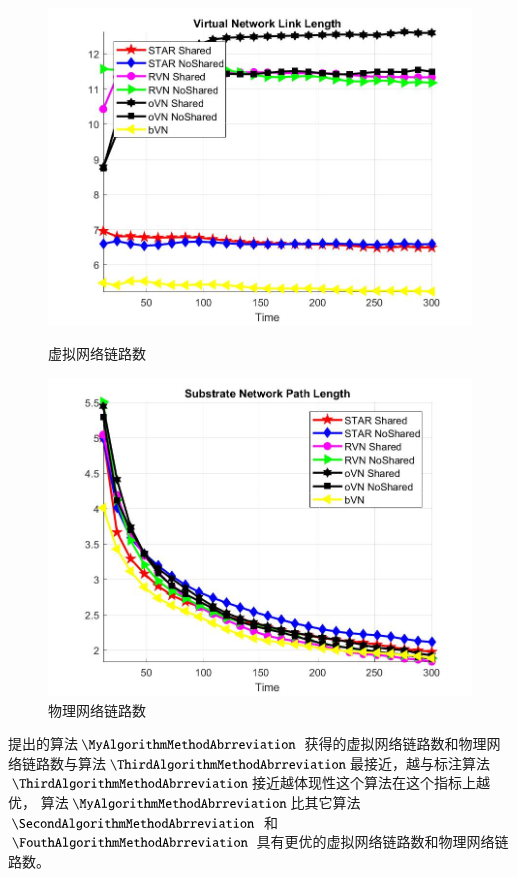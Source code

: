 \begin{figure}[htbp]
\centering
\begin{minipage}{0.4\textwidth}
\centering
\includegraphics[width=\textwidth]{figures/PathLengthAverageVirtualNetwork}
\caption{虚拟网络链路数}\label{fig:PathLengthAverageVirtualNetwork}
\end{minipage}
\begin{minipage}{0.4\textwidth}
\centering
\includegraphics[width=\textwidth]{figures/PathLengthAverageSubstrateNetwork}
\caption{物理网络链路数}\label{fig:PathLengthAverageSubstrateNetwork}
\end{minipage}
\end{figure}
提出的算法$\MyAlgorithmMethodAbrreviation$ 获得的虚拟网络链路数和物理网络链路数与算法$\ThirdAlgorithmMethodAbrreviation$最接近，越与标注算法$\ThirdAlgorithmMethodAbrreviation$接近越体现性这个算法在这个指标上越优， 算法$\MyAlgorithmMethodAbrreviation$比其它算法$\SecondAlgorithmMethodAbrreviation$ 和$\FouthAlgorithmMethodAbrreviation$ 具有更优的虚拟网络链路数和物理网络链路数。
